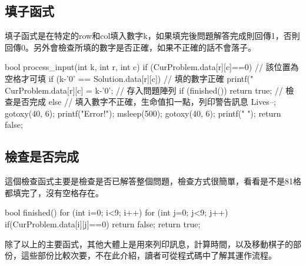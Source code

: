 \documentclass[12pt,a4paper]{article}
\begin{document}
\subsection{填子函式}
填子函式是在特定的row和col填入數字k，如果填完後問題解答完成則回傳1，否則回傳0。另外會檢查所填的數字是否正確，如果不正確的話不會落子。
\begin{inside}
bool process_input(int k, int r, int c)
{
	if (CurProblem.data[r][c]==0) { // 該位置為空格才可填
		if (k-'0' == Solution.data[r][c]) { // 填的數字正確
			printf("%
			CurProblem.data[r][c] = k-'0'; // 存入問題陣列
			if (finished()) return true; // 檢查是否完成
		} else { // 填入數字不正確，生命值扣一點，列印警告訊息
			Lives--;
			gotoxy(40, 6);
			printf("Error!");
			msleep(500);
			gotoxy(40, 6);
			printf("          ");
		}
	}
	return false;
}
\end{inside}

\subsection{檢查是否完成}
這個檢查函式主要是檢查是否已解答整個問題，檢查方式很簡單，看看是不是81格都填完了，沒有空格存在。
\begin{inside}
bool finished()
{
	for (int i=0; i<9; i++) {
		for (int j=0; j<9; j++) {
			if(CurProblem.data[i][j]==0) return false;
		}
	}
	return true;
}
\end{inside}

除了以上的主要函式，其他大體上是用來列印訊息，計算時間，以及移動棋子的部份，這些部份比較次要，不在此介紹，讀者可從程式碼中了解其運作流程。

\vspace{0.5cm}
\end{document}
